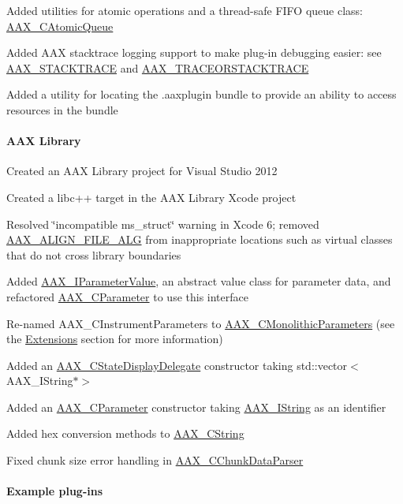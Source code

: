 \begin{DoxyItemize}
\item Added utilities for atomic operations and a thread-\/safe F\+I\+FO queue class\+: \mbox{\hyperlink{a01441}{A\+A\+X\+\_\+\+C\+Atomic\+Queue}} 
\item Added A\+AX stacktrace logging support to make plug-\/in debugging easier\+: see \mbox{\hyperlink{a00395_ae871829dd7297e4a5ae6c7094f6b5398}{A\+A\+X\+\_\+\+S\+T\+A\+C\+K\+T\+R\+A\+CE}} and \mbox{\hyperlink{a00395_a96862f9cb28b6a49eb5dbd6da9975ed1}{A\+A\+X\+\_\+\+T\+R\+A\+C\+E\+O\+R\+S\+T\+A\+C\+K\+T\+R\+A\+CE}} 
\item Added a utility for locating the .aaxplugin bundle to provide an ability to access resources in the bundle 
\end{DoxyItemize}\hypertarget{a00847_aax_sdk_2p2p0_AAX_Library}{}\paragraph{A\+A\+X Library}\label{a00847_aax_sdk_2p2p0_AAX_Library}

\begin{DoxyItemize}
\item Created an A\+AX Library project for Visual Studio 2012 
\item Created a libc++ target in the A\+AX Library Xcode project 
\item Resolved \char`\"{}incompatible ms\+\_\+struct\char`\"{} warning in Xcode 6; removed \mbox{\hyperlink{a00392_a8fbeac3c5db5ac694e85a021ed74dc9e}{A\+A\+X\+\_\+\+A\+L\+I\+G\+N\+\_\+\+F\+I\+L\+E\+\_\+\+A\+LG}} from inappropriate locations such as virtual classes that do not cross library boundaries 
\item Added \mbox{\hyperlink{a01853}{A\+A\+X\+\_\+\+I\+Parameter\+Value}}, an abstract value class for parameter data, and refactored \mbox{\hyperlink{a01537}{A\+A\+X\+\_\+\+C\+Parameter}} to use this interface 
\item Re-\/named {\ttfamily A\+A\+X\+\_\+\+C\+Instrument\+Parameters} to \mbox{\hyperlink{a01969}{A\+A\+X\+\_\+\+C\+Monolithic\+Parameters}} (see the \mbox{\hyperlink{a00847_aax_sdk_2p0p0_Extensions}{Extensions}} section for more information) 
\item Added an \mbox{\hyperlink{a01561}{A\+A\+X\+\_\+\+C\+State\+Display\+Delegate}} constructor taking {\ttfamily std\+::vector$<$\+A\+A\+X\+\_\+\+I\+String$\ast$$>$} 
\item Added an \mbox{\hyperlink{a01537}{A\+A\+X\+\_\+\+C\+Parameter}} constructor taking \mbox{\hyperlink{a01873}{A\+A\+X\+\_\+\+I\+String}} as an identifier 
\item Added hex conversion methods to \mbox{\hyperlink{a01573}{A\+A\+X\+\_\+\+C\+String}} 
\item Fixed chunk size error handling in \mbox{\hyperlink{a01461}{A\+A\+X\+\_\+\+C\+Chunk\+Data\+Parser}} 
\end{DoxyItemize}\hypertarget{a00847_aax_sdk_2p2p0_Example_plugins}{}\paragraph{Example plug-\/ins}\label{a00847_aax_sdk_2p2p0_Example_plugins}

